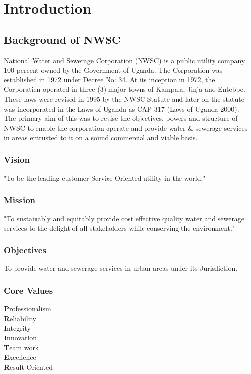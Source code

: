 \documentclass{article}
\begin{document}
\section{Introduction}\cite{r1}
\subsection{Background of NWSC}
National Water and Sewerage Corporation (NWSC) is a public utility company 100 percent owned by the Government of Uganda. The Corporation was established in 1972 under Decree No: 34. At its inception in 1972, the Corporation operated in three (3) major towns of Kampala, Jinja and Entebbe. These laws were revised in 1995 by the NWSC Statute and later on the statute was incorporated in the Laws of Uganda as CAP 317 (Laws of Uganda 2000). The primary aim of this was to revise the objectives, powers and structure of NWSC to enable the corporation operate and provide water \& sewerage services in areas entrusted to it on a sound commercial and viable basis.
\subsubsection{Vision}
"To be the leading customer Service Oriented utility in the world."  
\subsubsection{Mission}
"To sustainably and equitably provide cost effective quality water and sewerage services to the delight of all stakeholders while conserving the environment."
\subsubsection{Objectives}
To provide water and sewerage services in urban areas under its Jurisdiction.
\subsubsection{Core Values}
\textbf{P}rofessionalism\\ 
\textbf{R}eliability\\
\textbf{I}ntegrity\\
\textbf{I}nnovation\\
\textbf{T}eam work\\
\textbf{E}xcellence\\
\textbf{R}esult Oriented\\
\end{document}
